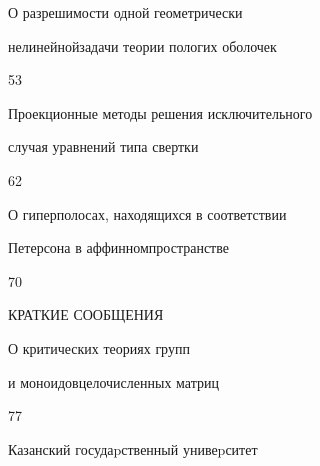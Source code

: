 





{О разрешимости одной геометрически


нелинейной\newline задачи теории пологих оболочек}{53}




{Проекционные методы решения исключительного\newline


случая уравнений типа свертки}{62}




{О гиперполосах, находящихся в соответствии


Петерсона в аффинном\newline пространстве}{70}





\bigskip


{\centerline{КРАТКИЕ СООБЩЕНИЯ}}


\bigskip




{О критических теориях групп


и моноидов\newline  целочисленных матриц}{77}


\bigskip















\vfill


\noindent\raisebox{2pt}{\copyright} Казанский госудаpственный унивеpситет





